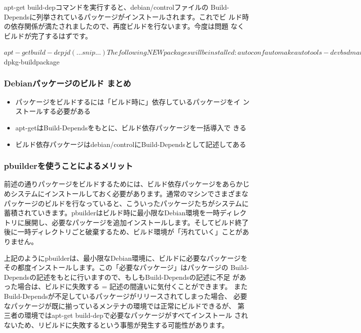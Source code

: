 \documentclass[mingoth,a4paper]{jsarticle}
\begin{document}
apt-get build-depコマンドを実行すると、debian/controlファイルの
Build-Dependsに列挙されているパッケージがインストールされます。これでビ
ルド時の依存関係が満たされましたので、再度ビルドを行ないます。今度は問題
なくビルドが完了するはずです。

\begin{commandline}
$ apt-get build-dep jd
   (...snip...)
The following NEW packages will be installed:
  autoconf automake autotools-dev bsdmainutils debhelper defoma diffstat file
  fontconfig fontconfig-config gettext gettext-base groff-base
  hardening-wrapper html2text intltool-debian libasound2 libasound2-dev
   (...snip...)
$ dpkg-buildpackage
\end{commandline}

\subsubsection{Debianパッケージのビルド まとめ}

\begin{itemize}
 \item パッケージをビルドするには「ビルド時に」依存しているパッケージをイ
       ンストールする必要がある

 \item apt-getはBuild-Dependsをもとに、ビルド依存パッケージを一括導入で
       きる

 \item ビルド依存パッケージはdebian/controlにBuild-Dependsとして記述してある

\end{itemize}

\subsubsection{pbuilderを使うことによるメリット}

前述の通りパッケージをビルドするためには、ビルド依存パッケージをあらかじ
めシステムにインストールしておく必要があります。通常のマシンでさまざまな
パッケージのビルドを行なっていると、こういったパッケージたちがシステムに
蓄積されていきます。pbuilderはビルド時に最小限なDebian環境を一時ディレク
トリに展開し、必要なパッケージを追加インストールします。そしてビルド終了
後に一時ディレクトリごと破棄するため、ビルド環境が「汚れていく」ことがあ
りません。

上記のようにpbuilderは、最小限なDebian環境に、ビルドに必要なパッケージを
その都度インストールします。この「必要なパッケージ」はパッケージの
Build-Dependsの記述をもとに行いますので、もしもBuild-Dependsの記述に不足
があった場合は、ビルドに失敗する = 記述の間違いに気付くことができます。
またBuild-Dependsが不足しているパッケージがリリースされてしまった場合、
必要なパッケージが既に揃っているメンテナの環境では正常にビルドできるが、
第三者の環境ではapt-get build-depで必要なパッケージがすべてインストール
されないため、リビルドに失敗するという事態が発生する可能性があります。
\end{document}

